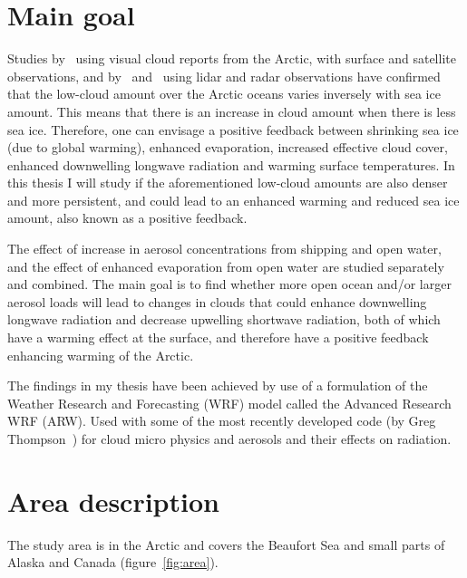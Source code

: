 \section{Main goal}
Studies by~\citet{Eastman2010a} using visual cloud reports from the Arctic, with surface and satellite observations, and by~\citet{Kay2009} and~\citet{Palm2010} using lidar and radar observations have confirmed that the low-cloud amount over the Arctic oceans varies inversely with sea ice amount. This means that there is an increase in cloud amount when there is less sea ice. Therefore, one can envisage a positive feedback between shrinking sea ice (due to global warming), enhanced evaporation, increased effective cloud cover, enhanced downwelling longwave radiation and warming surface temperatures. In this thesis I will study if the aforementioned low-cloud amounts are also denser and more persistent, and could lead to an enhanced warming and reduced sea ice amount, also known as a positive feedback.

The effect of increase in aerosol concentrations from shipping and open water, and the effect of enhanced evaporation from open water are studied separately and combined. The main goal is to find whether more open ocean and/or larger aerosol loads will lead to changes in clouds that could enhance downwelling longwave radiation and decrease upwelling shortwave radiation, both of which have a warming effect at the surface, and therefore have a positive feedback enhancing warming of the Arctic.


The findings in my thesis have been achieved by use of a formulation of the Weather Research and Forecasting (WRF) model called the Advanced Research WRF (ARW). Used with some of the most recently developed code (by Greg Thompson~\citep{Thompson2014}) for cloud micro physics and aerosols and their effects on radiation.

\section{Area description}
The study area is in the Arctic and covers the Beaufort Sea and small parts of Alaska and Canada (figure~\ref{fig:area}).

